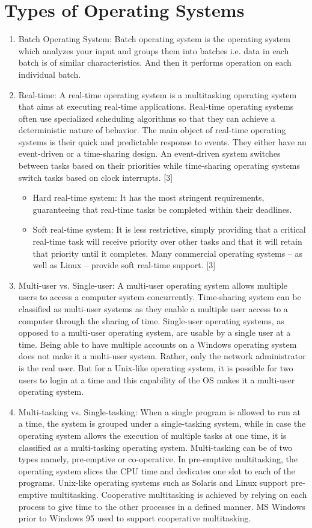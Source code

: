 \documentclass[11pt,a4paper]{article}
\begin{document}
	\section{Types of Operating Systems}
	\begin{enumerate}
	\item Batch Operating System:  Batch operating system is the operating system which analyzes your input and groups them into batches i.e. data in each batch is of similar characteristics. And then it performs operation on each individual batch.
	\item Real-time:  A real-time operating system is a multitasking operating system that aims at executing real-time applications. Real-time operating systems often use specialized scheduling algorithms so that they can achieve a deterministic nature of behavior. The main object of real-time operating systems is their quick and predictable response to events. They either have an event-driven or a time-sharing design. An event-driven system switches between tasks based on their priorities while time-sharing operating systems switch tasks based on clock interrupts. [3]
	\begin{itemize}
		\item Hard real-time system:  It has the most stringent requirements, guaranteeing that real-time tasks be completed within their deadlines.  
		\item Soft real-time system:  It is less restrictive, simply providing that a critical real-time task will receive priority over other tasks and that it will retain that priority until it completes. Many commercial operating systems – as well as Linux – provide soft real-time support. [3]
	\end{itemize}
	\item Multi-user vs. Single-user:  A multi-user operating system allows multiple users to access a computer system concurrently. Time-sharing system can be classified as multi-user systems as they enable a multiple user access to a computer through the sharing of time. Single-user operating systems, as opposed to a multi-user operating system, are usable by a single user at a time. Being able to have multiple accounts on a Windows operating system does not make it a multi-user system. Rather, only the network administrator is the real user. But for a Unix-like operating system, it is possible for two users to login at a time and this capability of the OS makes it a multi-user operating system.
	\item Multi-tasking vs. Single-tasking:  When a single program is allowed to run at a time, the system is grouped under a single-tasking system, while in case the operating system allows the execution of multiple tasks at one time, it is classified as a multi-tasking operating system. Multi-tasking can be of two types namely, pre-emptive or co-operative. In pre-emptive multitasking, the operating system slices the CPU time and dedicates one slot to each of the programs. Unix-like operating systems such as Solaris and Linux support pre-emptive multitasking. Cooperative multitasking is achieved by relying on each process to give time to the other processes in a defined manner. MS Windows prior to Windows 95 used to support cooperative multitasking.

\end{enumerate}
\end{document}
